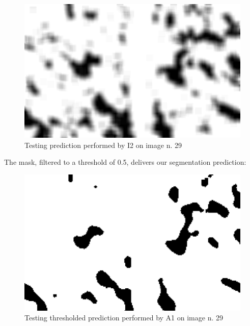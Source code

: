 \begin{figure}[H]
 \centering
 \includegraphics[scale=0.2, cframe=bluepoli 2pt]{./resources/I2_avg_29.png}
 \caption[A1 test prediction]
    {Testing prediction performed by I2 on image n. 29}
\end{figure}

\par
The mask, filtered to a threshold of 0.5, delivers our segmentation prediction:

\begin{figure}[H]
 \centering
 \includegraphics[scale=0.2, cframe=bluepoli 2pt]{./resources/A1_pred_image_29.png}
 \caption[A1 thresholded test prediction]
    {Testing thresholded prediction performed by A1 on image n. 29}
\end{figure}


